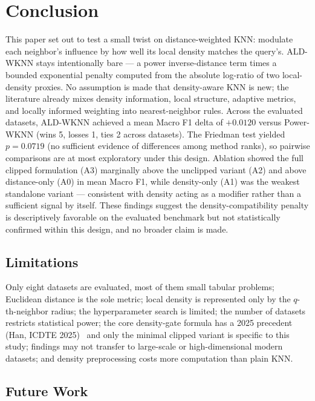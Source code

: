 \documentclass[conference]{IEEEtran}
\begin{document}
\section{Conclusion}

This paper set out to test a small twist on distance-weighted KNN: modulate each neighbor's influence by how well its local density matches the query's. ALD-WKNN stays intentionally bare --- a power inverse-distance term times a bounded exponential penalty computed from the absolute log-ratio of two local-density proxies. No assumption is made that density-aware KNN is new; the literature already mixes density information, local structure, adaptive metrics, and locally informed weighting into nearest-neighbor rules. Across the evaluated datasets, ALD-WKNN achieved a mean Macro F1 delta of $+0.0120$ versus Power-WKNN (wins 5, losses 1, ties 2 across datasets). The Friedman test yielded $p = 0.0719$ (no sufficient evidence of differences among method ranks), so pairwise comparisons are at most exploratory under this design. Ablation showed the full clipped formulation (A3) marginally above the unclipped variant (A2) and above distance-only (A0) in mean Macro F1, while density-only (A1) was the weakest standalone variant --- consistent with density acting as a modifier rather than a sufficient signal by itself. These findings suggest the density-compatibility penalty is descriptively favorable on the evaluated benchmark but not statistically confirmed within this design, and no broader claim is made.

\subsection{Limitations}

Only eight datasets are evaluated, most of them small tabular problems; Euclidean distance is the sole metric; local density is represented only by the $q$-th-neighbor radius; the hyperparameter search is limited; the number of datasets restricts statistical power; the core density-gate formula has a 2025 precedent (Han, ICDTE 2025)~\cite{dynamicdwknn2025} and only the minimal clipped variant is specific to this study; findings may not transfer to large-scale or high-dimensional modern datasets; and density preprocessing costs more computation than plain KNN.

\subsection{Future Work}
\end{document}
